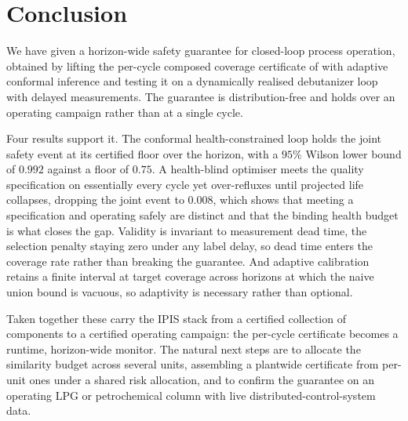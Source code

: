 \section{Conclusion}
\label{sec:conclusion}

We have given a horizon-wide safety guarantee for closed-loop process operation, obtained by
lifting the per-cycle composed coverage certificate of \citet{busico_m4} with adaptive conformal
inference \citep{gibbs2021} and testing it on a dynamically realised debutanizer loop with
delayed measurements. The guarantee is distribution-free and holds over an operating campaign
rather than at a single cycle.

Four results support it. The conformal health-constrained loop holds the joint safety event at
its certified floor over the horizon, with a $95\%$ Wilson lower bound of $0.992$ against a floor
of $0.75$. A health-blind optimiser meets the quality specification on essentially every cycle
yet over-refluxes until projected life collapses, dropping the joint event to $0.008$, which
shows that meeting a specification and operating safely are distinct and that the binding health
budget is what closes the gap. Validity is invariant to measurement dead time, the selection
penalty staying zero under any label delay, so dead time enters the coverage rate rather than
breaking the guarantee. And adaptive calibration retains a finite interval at target coverage
across horizons at which the naive union bound is vacuous, so adaptivity is necessary rather than
optional.

Taken together these carry the IPIS stack from a certified collection of components to a
certified operating campaign: the per-cycle certificate becomes a runtime, horizon-wide monitor.
The natural next steps are to allocate the similarity budget across several units, assembling a
plantwide certificate from per-unit ones under a shared risk allocation, and to confirm the
guarantee on an operating LPG or petrochemical column with live distributed-control-system data.

